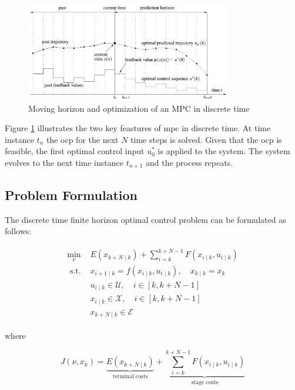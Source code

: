 \documentclass[10pt,a4paper]{article}
\begin{document}
\begin{figure}[h]
	\begin{center}
		\includegraphics[width=0.8\textwidth]{img/nmpc_idea.png}
		\caption{Moving horizon and optimization of an MPC in discrete time \cite{nmpcBible}}
		\label{pic:nmpc_idea}
	\end{center}
\end{figure}

Figure \ref{pic:nmpc_idea} illustrates the two key feastures of \gls{mpc} in discrete time. At time instance $t_n$ 
the \gls{ocp} for the next $N$ time steps is solved. Given that the \gls{ocp} is feasible, the first optimal control
input $u^*_0$ is applied to the system. The system evolves to the next time instance $t_{n+1}$ and the process repeats.

\subsection{Problem Formulation}
The discrete time finite horizon optimal control problem can be formulated as follows:

\begin{align}
\label{eq:mpc_problem}
    \begin{array}{ll}
        \min\limits_{\nu} & E\left(x_{k+N \mid k}\right)+\sum_{i=k}^{k+N-1} F\left(x_{i \mid k}, u_{i \mid k}\right) \\[2em]
        \text { s.t. } & x_{i+1 \mid k}=f\left(x_{i \mid k}, u_{i \mid k}\right), \quad x_{k \mid k}=x_k\\
        & u_{i \mid k} \in \mathcal{U}, \quad i \in[k, k+N-1]\\
        & x_{i \mid k} \in \mathcal{X}, \quad i \in[k, k+N-1]\\
        & x_{k+N \mid k} \in \mathcal{E}
    \end{array}
\end{align}

where

\begin{equation}
\label{eq:mpc_costFunction}
    J\left(\nu, x_k\right)=\underbrace{E\left(x_{k+N \mid k}\right)}_{\text{terminal costs}} + \underbrace{\sum_{i=k}^{k+N-1} F\left(x_{i \mid k}, u_{i \mid k}\right)}_{\text{stage costs}}
\end{equation}
\end{document}
